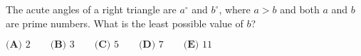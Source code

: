 The acute angles of a right triangle are $a^{\circ}$ and $b^{\circ}$, where $a>b$ and both $a$ and $b$ are prime numbers. What is the least possible value of $b$?

$\textbf{(A) }2\qquad\textbf{(B) }3\qquad\textbf{(C) }5\qquad\textbf{(D) }7\qquad\textbf{(E) }11$